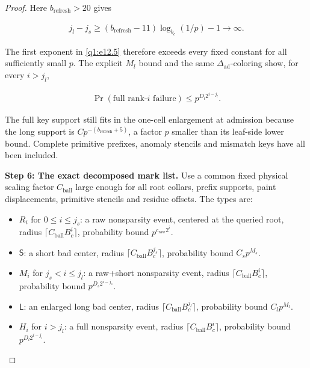 \begin{proof}
Here \(b_{\mathrm{refresh}}>20\) gives

\[
\begin{gathered}
j_{l}-j_{s} \ge  (b_{\mathrm{refresh}}-11)\log _{b_{c}}(1/p)-1 \to  \infty.
\end{gathered}
\]

The first exponent in \eqref{q1:e12.5} therefore exceeds every fixed constant for all sufficiently small \(p\). The explicit \(M_{l}\) bound and the same \(\Delta_{\mathrm{ad}}\)-coloring show, for every \(i>j_{l}\),

\begin{equation}\label{q1:e12.6}
\begin{gathered}
\Pr(\text{full rank-}i\text{ failure}) \le  p^{D_{l} 2^{i-j_{l}}}.
\end{gathered}
\end{equation}

The full key support still fits in the one-cell enlargement at admission because the long support is \(C p^{-(b_{\mathrm{refresh}}+5)}\), a factor \(p\) smaller than its leaf-side lower bound. Complete primitive prefixes, anomaly stencils and mismatch keys have all been included.

\smallskip\noindent\textbf{Step 6: The exact decomposed mark list.} Use a common fixed physical scaling factor \(C_{\mathrm{ball}}\) large enough for all root collars, prefix supports, paint displacements, primitive stencils and residue offsets. The types are:


\begin{itemize}
\item \(R_{i}\) for \(0\le i\le j_{s}\): a raw nonsparsity event, centered at the queried root, radius \(\lceil C_{\mathrm{ball}} B_{c}^{i}\rceil\), probability bound \(p^{c_{\mathrm{raw}} 2^{i}}\).
\item \(\mathsf S\): a short bad center, radius \(\lceil C_{\mathrm{ball}} B_{c}^{j_{s}}\rceil\), probability bound \(C_{s} p^{M_{s}}\).
\item \(M_{i}\) for \(j_{s}<i\le j_{l}\): a raw+short nonsparsity event, radius \(\lceil C_{\mathrm{ball}} B_{c}^{i}\rceil\), probability bound \(p^{D_{s} 2^{i-j_{s}}}\).
\item \(\mathsf L\): an enlarged long bad center, radius \(\lceil C_{\mathrm{ball}} B_{c}^{j_{l}}\rceil\), probability bound \(C_{l} p^{M_{l}}\).
\item \(H_{i}\) for \(i>j_{l}\): a full nonsparsity event, radius \(\lceil C_{\mathrm{ball}} B_{c}^{i}\rceil\), probability bound \(p^{D_{l} 2^{i-j_{l}}}\).
\end{itemize}


\end{proof}
